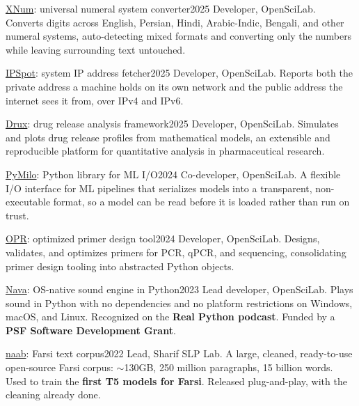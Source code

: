   \cventry
    {\href{https://github.com/openscilab/xnum}{XNum}: universal numeral system converter}{2025}
    {Developer, OpenSciLab. Converts digits across English, Persian, Hindi, Arabic-Indic, Bengali, and other numeral systems, auto-detecting mixed formats and converting only the numbers while leaving surrounding text untouched.}

  \cventry
    {\href{https://github.com/openscilab/ipspot}{IPSpot}: system IP address fetcher}{2025}
    {Developer, OpenSciLab. Reports both the private address a machine holds on its own network and the public address the internet sees it from, over IPv4 and IPv6.}

  \cventry
    {\href{https://github.com/openscilab/drux}{Drux}: drug release analysis framework}{2025}
    {Developer, OpenSciLab. Simulates and plots drug release profiles from mathematical models, an extensible and reproducible platform for quantitative analysis in pharmaceutical research.}

  \cventry
    {\href{https://github.com/openscilab/pymilo}{PyMilo}: Python library for ML I/O}{2024}
    {Co-developer, OpenSciLab. A flexible I/O interface for ML pipelines that serializes models into a transparent, non-executable format, so a model can be read before it is loaded rather than run on trust.}

  \cventry
    {\href{https://github.com/openscilab/opr}{OPR}: optimized primer design tool}{2024}
    {Developer, OpenSciLab. Designs, validates, and optimizes primers for PCR, qPCR, and sequencing, consolidating primer design tooling into abstracted Python objects.}

  \cventry
    {\href{https://github.com/openscilab/nava}{Nava}: OS-native sound engine in Python}{2023}
    {Lead developer, OpenSciLab. Plays sound in Python with no dependencies and no platform restrictions on Windows, macOS, and Linux. Recognized on the \textbf{Real Python podcast}. Funded by a \textbf{PSF Software Development Grant}.}

  \cventry
    {\href{https://huggingface.co/datasets/SLPL/naab}{naab}: Farsi text corpus}{2022}
    {Lead, Sharif SLP Lab. A large, cleaned, ready-to-use open-source Farsi corpus: $\sim$130GB, 250 million paragraphs, 15 billion words. Used to train the \textbf{first T5 models for Farsi}. Released plug-and-play, with the cleaning already done.}

